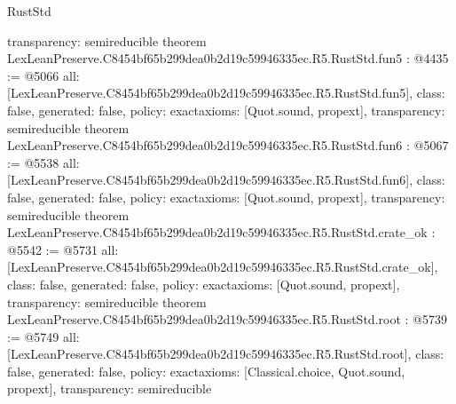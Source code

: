 \begin{lexlean}{RustStd}
\begin{coremodule}
{  transparency: semireducible
}
theorem LexLeanPreserve.C8454bf65b299dea0b2d19c59946335ec.R5.RustStd.fun5 : @4435 := @5066 {
  all: [LexLeanPreserve.C8454bf65b299dea0b2d19c59946335ec.R5.RustStd.fun5],
  class: false,
  generated: false,
  policy: exact{axioms: [Quot.sound, propext]},
  transparency: semireducible
}
theorem LexLeanPreserve.C8454bf65b299dea0b2d19c59946335ec.R5.RustStd.fun6 : @5067 := @5538 {
  all: [LexLeanPreserve.C8454bf65b299dea0b2d19c59946335ec.R5.RustStd.fun6],
  class: false,
  generated: false,
  policy: exact{axioms: [Quot.sound, propext]},
  transparency: semireducible
}
theorem LexLeanPreserve.C8454bf65b299dea0b2d19c59946335ec.R5.RustStd.crate_ok : @5542 := @5731 {
  all: [LexLeanPreserve.C8454bf65b299dea0b2d19c59946335ec.R5.RustStd.crate_ok],
  class: false,
  generated: false,
  policy: exact{axioms: [Quot.sound, propext]},
  transparency: semireducible
}
theorem LexLeanPreserve.C8454bf65b299dea0b2d19c59946335ec.R5.RustStd.root : @5739 := @5749 {
  all: [LexLeanPreserve.C8454bf65b299dea0b2d19c59946335ec.R5.RustStd.root],
  class: false,
  generated: false,
  policy: exact{axioms: [Classical.choice, Quot.sound, propext]},
  transparency: semireducible
}


\end{coremodule}
\end{lexlean}
